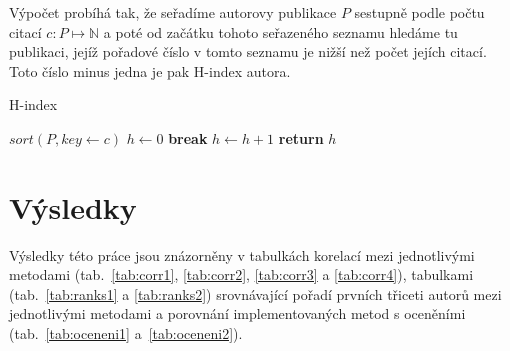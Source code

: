 \documentclass{bakalarka}
\begin{document}
Výpočet probíhá tak, že seřadíme autorovy publikace $P$ sestupně podle počtu
citací $c: P \mapsto \mathbb{N}$ a poté od začátku tohoto seřazeného seznamu
hledáme tu publikaci, jejíž pořadové číslo v tomto seznamu je nižší než počet
jejích citací. Toto číslo minus jedna je pak H-index autora.
\begin{center}
\begin{minipage}{\textwidth}
\begin{algorithm}[H]
	\caption{H-index}
		\label{alg:hindex}

	\begin{algorithmic}[1]
	\Statex
		\State $sort(P, key \gets c)$
		\State $h \gets 0$
				\State \textbf{break}
			\EndIf
			\State $h \gets h + 1$
		\EndFor
		\State \textbf{return} $h$
	\EndFunction
	\end{algorithmic}
\end{algorithm}
\end{minipage}
\end{center}
\mbox{}








\chapter{Výsledky}
Výsledky této práce jsou znázorněny v tabulkách korelací mezi jednotlivými
metodami (tab.~\ref{tab:corr1}, \ref{tab:corr2}, \ref{tab:corr3} a
\ref{tab:corr4}), tabulkami (tab.~\ref{tab:ranks1} a \ref{tab:ranks2})
srovnávající pořadí prvních třiceti autorů mezi jednotlivými metodami a
porovnání implementovaných metod s oceněními (tab.~\ref{tab:oceneni1}
a~\ref{tab:oceneni2}).
\end{document}
